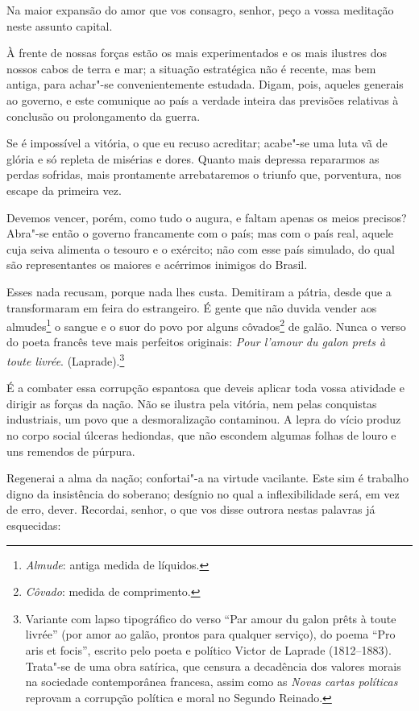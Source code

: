 \sectionitem

Na maior expansão do amor que vos consagro, senhor, peço a vossa
meditação neste assunto capital.

À frente de nossas forças estão os mais experimentados e os mais
ilustres dos nossos cabos de terra e mar; a situação estratégica não é
recente, mas bem antiga, para achar"-se convenientemente estudada.
Digam, pois, aqueles generais ao governo, e este comunique ao país a
verdade inteira das previsões relativas à conclusão ou prolongamento da guerra.

Se é impossível a vitória, o que eu recuso acreditar; acabe"-se uma
luta vã de glória e só repleta de misérias e dores. Quanto mais
depressa repararmos as perdas sofridas, mais prontamente arrebataremos
o triunfo que, porventura, nos escape da primeira vez. 

Devemos vencer, porém, como tudo o augura, e faltam apenas os meios
precisos? Abra"-se então o governo francamente com o país; mas com o
país real, aquele cuja seiva alimenta o tesouro e o exército; não com
esse país simulado, do qual são representantes os maiores e acérrimos
inimigos do Brasil.

Esses nada recusam, porque nada lhes custa. Demitiram a pátria, desde
que a transformaram em feira do estrangeiro. É gente que não duvida
vender aos almudes\footnote{ \textit{Almude}: antiga medida de líquidos.}
 o sangue e o suor do povo por alguns
côvados\footnote{ \textit{Côvado}: medida de comprimento.}
 de galão. Nunca o verso do poeta francês teve mais perfeitos originais:
\textit{Pour l'amour du galon prets à toute livrée}.
(Laprade).\footnote{ Variante com lapso tipográfico do verso ``Par amour du galon prêts à
toute livrée'' (por amor ao galão, prontos para qualquer serviço), do
poema ``Pro aris et focis'', escrito pelo poeta e político Victor de
Laprade (1812--1883). Trata"-se de uma obra satírica, que censura a
decadência dos valores morais na sociedade contemporânea francesa,
assim como as \textit{Novas cartas políticas} reprovam a corrupção política e
moral no Segundo Reinado.}

É a combater essa corrupção espantosa que deveis aplicar toda vossa
atividade e dirigir as forças da nação. Não se ilustra pela vitória,
nem pelas conquistas industriais, um povo que a desmoralização
contaminou. A lepra do vício produz no corpo social úlceras hediondas,
que não escondem algumas folhas de louro e uns remendos de púrpura. 

Regenerai a alma da nação; confortai"-a na virtude vacilante. Este sim
é trabalho digno da insistência do soberano; desígnio no qual a
inflexibilidade será, em vez de erro, dever. Recordai, senhor, o que
vos disse outrora nestas palavras já esquecidas:

